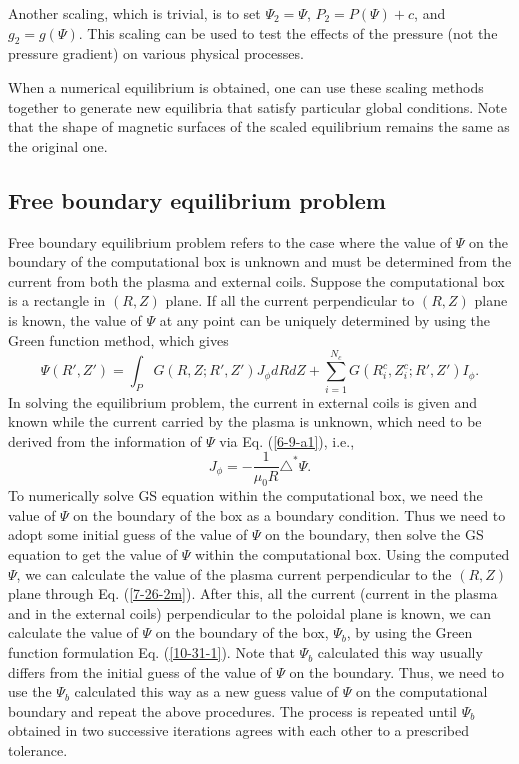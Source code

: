 \documentclass{article}
\begin{document}
Another scaling, which is trivial, is to set $\Psi_2 = \Psi$, $P_2 = P (\Psi)
+ c$, and $g_2 = g (\Psi)$. This scaling can be used to test the effects of
the pressure (not the pressure gradient) on various physical processes.

When a numerical equilibrium is obtained, one can use these scaling methods
together to generate new equilibria that satisfy particular global conditions.
Note that the shape of magnetic surfaces of the scaled equilibrium remains the
same as the original one.

\subsection{Free boundary equilibrium problem}

Free boundary equilibrium problem refers to the case where the value of $\Psi$
on the boundary of the computational box is unknown and must be determined
from the current from both the plasma and external coils. Suppose the
computational box is a rectangle in $(R, Z)$ plane. If all the current
perpendicular to $(R, Z)$ plane is known, the value of $\Psi$ at any point can
be uniquely determined by using the Green function method, which gives
\begin{equation}
  \label{10-31-1} \Psi (R', Z') = \int_P G (R, Z ; R', Z') J_{\phi} d R d Z +
  \sum_{i = 1}^{N_c} G (R^c_i, Z_i^c ; R', Z') I_{\phi} .
\end{equation}
In solving the equilibrium problem, the current in external coils is given and
known while the current carried by the plasma is unknown, which need to be
derived from the information of $\Psi$ via Eq. (\ref{6-9-a1}), i.e.,
\begin{equation}
  \label{7-26-2m} J_{\phi} = - \frac{1}{\mu_0 R} \triangle^{\ast} \Psi .
\end{equation}
To numerically solve GS equation within the computational box, we need the
value of $\Psi$ on the boundary of the box as a boundary condition. Thus we
need to adopt some initial guess of the value of $\Psi$ on the boundary, then
solve the GS equation to get the value of $\Psi$ within the computational box.
Using the computed $\Psi$, we can calculate the value of the plasma current
perpendicular to the $(R, Z)$ plane through Eq. (\ref{7-26-2m}). After this,
all the current (current in the plasma and in the external coils)
perpendicular to the poloidal plane is known, we can calculate the value of
$\Psi$ on the boundary of the box, $\Psi_b$, by using the Green function
formulation Eq. (\ref{10-31-1}). Note that $\Psi_b$ calculated this way
usually differs from the initial guess of the value of $\Psi$ on the boundary.
Thus, we need to use the $\Psi_b$ calculated this way as a new guess value of
$\Psi$ on the computational boundary and repeat the above procedures. The
process is repeated until $\Psi_b$ obtained in two successive iterations
agrees with each other to a prescribed tolerance.
\end{document}
